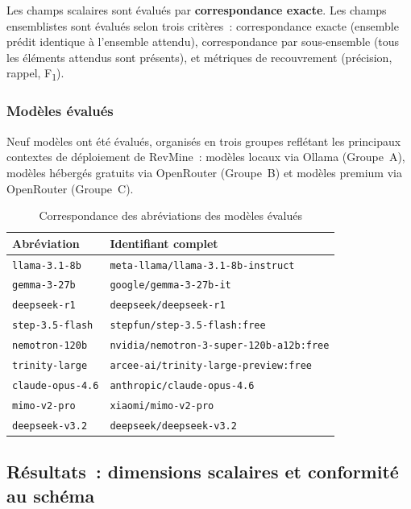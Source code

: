 Les champs scalaires sont évalués par \textbf{correspondance exacte}. Les champs ensemblistes sont
évalués selon trois critères~: correspondance exacte (ensemble prédit identique à l'ensemble
attendu), correspondance par sous-ensemble (tous les éléments attendus sont présents), et métriques
de recouvrement (précision, rappel, F\textsubscript{1}).

\subsubsection{Modèles évalués}

Neuf modèles ont été évalués, organisés en trois groupes reflétant les principaux contextes de
déploiement de RevMine~: modèles locaux via Ollama (Groupe~A), modèles hébergés gratuits via
OpenRouter (Groupe~B) et modèles premium via OpenRouter (Groupe~C).

\begin{table}[H]
\centering
\small
\caption{Correspondance des abréviations des modèles évalués}
\label{tab:rq2_abbrev_fr}
\begin{tabular}{|>{\raggedright\arraybackslash}p{4cm}
                |>{\raggedright\arraybackslash}p{9cm}|}
\hline
\textbf{Abréviation} & \textbf{Identifiant complet} \\
\hline
\texttt{llama-3.1-8b}    & \texttt{meta-llama/llama-3.1-8b-instruct} \\
\hline
\texttt{gemma-3-27b}     & \texttt{google/gemma-3-27b-it} \\
\hline
\texttt{deepseek-r1}     & \texttt{deepseek/deepseek-r1} \\
\hline
\texttt{step-3.5-flash}  & \texttt{stepfun/step-3.5-flash:free} \\
\hline
\texttt{nemotron-120b}   & \texttt{nvidia/nemotron-3-super-120b-a12b:free} \\
\hline
\texttt{trinity-large}   & \texttt{arcee-ai/trinity-large-preview:free} \\
\hline
\texttt{claude-opus-4.6} & \texttt{anthropic/claude-opus-4.6} \\
\hline
\texttt{mimo-v2-pro}     & \texttt{xiaomi/mimo-v2-pro} \\
\hline
\texttt{deepseek-v3.2}   & \texttt{deepseek/deepseek-v3.2} \\
\hline
\end{tabular}
\end{table}

\subsection{Résultats~: dimensions scalaires et conformité au schéma}

